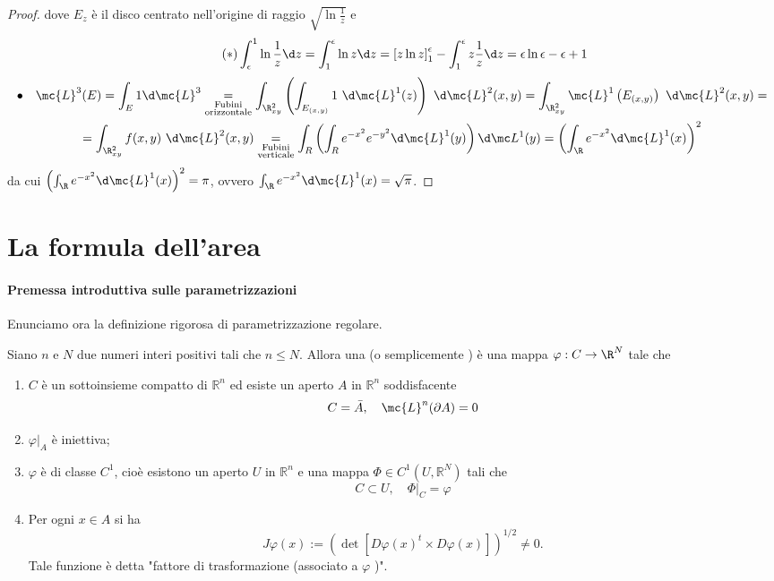 \begin{proof}
    dove $E_z$ è il disco centrato nell'origine di raggio $\sqrt{\ln\frac{1}{z}}$ e
    \[\tag{$*$} \int_\epsilon^1\ln\frac{1}{z}\d z = \int_1^\epsilon \ln z \d z =\left[ z\ln z \right]_1^\epsilon -\int_1^\epsilon z\frac{1}{z}\d z = \epsilon \ln\epsilon -\epsilon +1\]
    \begin{multline*}
        \bullet\quad \mc{L}^3(E) = \int_E1\d\mc{L}^3 \underset{\substack{\text{Fubini}\\\text{orizzontale}}}{=}\int_{\R^2_{xy}}\left(\int_{E_{(x,y)}}1\ \d \mc{L}^1(z)\right)\ \d \mc{L}^2(x,y) = \int_{\R^2_{xy}}\mc{L}^1\left(E_{(x,y)}\right)\ \d \mc{L}^2(x,y) =\\ = \int_{\R^2_{xy}}f(x,y)\ \d \mc{L}^2(x,y) \underset{\substack{\text{Fubini}\\\text{verticale}}}{=}\int_R\left(\int_R e^{-x^2}e^{-y^2}\d\mc{L}^1(y)\right)\d\mc L^1(y) = \left(\int_\R e^{-x^2}\d\mc{L}^1(x)\right)^2 
    \end{multline*}
    da cui $\left(\int_\R e^{-x^2}\d\mc{L}^1(x)\right)^2 = \pi$, ovvero $\int_\R e^{-x^2}\d\mc{L}^1(x) = \sqrt{\pi}$.
\end{proof}

\section{La formula dell'area}

\paragraph{Premessa introduttiva sulle parametrizzazioni} Enunciamo ora la definizione rigorosa di parametrizzazione regolare.

\begin{boxdef}\label{def: parametrizzazione}
    Siano $n$ e $N$ due numeri interi positivi tali che $n \leq N$. Allora una  (o semplicemente ) è una mappa $\varphi: C \to \R^{N}$ tale che
    \begin{enumerate}[label=$\roman*)$]
        \item $C$ è un sottoinsieme compatto di $\mathbb{R}^{n}$ ed esiste un aperto $A$ in $\mathbb{R}^{n}$ soddisfacente
            \[C=\bar{A}, \quad \mc{L}^{n}(\partial A)=0\]
        \item $\left.\varphi\right|_{A}$ è iniettiva;
        \item $\varphi$ è di classe $C^{1}$, cioè esistono un aperto $U$ in $\mathbb{R}^{n}$ e una mappa $\Phi \in C^{1}\left(U, \mathbb{R}^{N}\right)$ tali che
        \[C \subset U,\left.\quad \Phi\right|_{C}=\varphi\]
        \item Per ogni $x \in A$ si ha
            \[J \varphi(x):=\left(\operatorname{det}\left[D \varphi(x)^{t} \times D \varphi(x)\right]\right)^{1 / 2} \neq 0 .\]
        Tale funzione è detta "fattore di trasformazione (associato a $\varphi$ )".
    \end{enumerate}
\end{boxdef}


